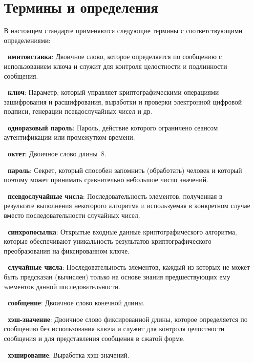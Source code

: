 \chapter{Термины и определения}

В настоящем стандарте применяются  
следующие термины с соответствующими определениями:

{\bf \thedefctr~имитовставка}:
Двоичное слово, 
которое определяется по сообщению с использованием ключа 
и служит для контроля целостности и подлинности сообщения.

{\bf \thedefctr~ключ}:
Параметр, который управляет криптографическими 
операциями зашифрования и расшифрования, 
выработки и проверки электронной цифровой подписи, 
генерации псевдослучайных чисел и др.

{\bf \thedefctr~одноразовый пароль}:
Пароль, действие которого ограничено сеансом 
аутентификации или промежутком времени.

{\bf \thedefctr~октет}:
Двоичное слово длины~$8$.

{\bf \thedefctr~пароль}:
Секрет, который способен запомнить (обработать) 
человек и который поэтому может принимать сравнительно небольшое 
число значений.

{\bf \thedefctr~псевдослучайные числа}:
Последовательность элементов, полученная в результате выполнения 
некоторого алгоритма и используемая в конкретном случае 
вместо последовательности случайных чисел.
%

{\bf \thedefctr~синхропосылка}:
Открытые входные данные криптографического алгоритма,
которые обеспечивают уникальность результатов 
криптографического преобразования на фиксированном ключе.

{\bf \thedefctr~случайные числа}:
Последовательность элементов, каждый из которых не может быть предсказан
(вычислен) только на основе знания предшествующих 
ему элементов данной последовательности.
%


{\bf \thedefctr~сообщение}:
Двоичное слово конечной длины.

{\bf \thedefctr~хэш-значение}:
Двоичное слово фиксированной длины, 
которое определяется по сообщению без использования ключа и 
служит для контроля целостности сообщения и для представления 
сообщения в сжатой форме.

{\bf \thedefctr~хэширование}:
Выработка хэш-значений.






